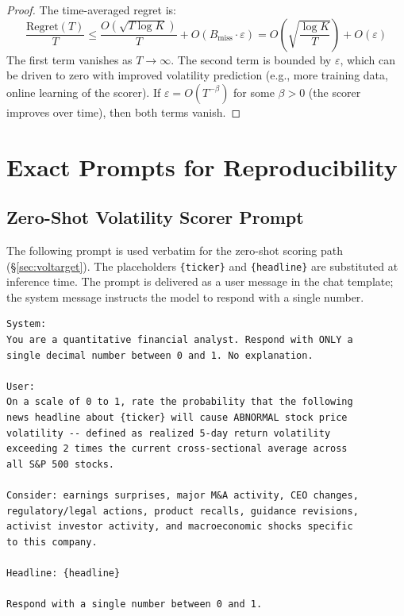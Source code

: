 \documentclass{article}
\begin{document}
\begin{proof}
The time-averaged regret is:
\begin{equation}
  \frac{\text{Regret}(T)}{T} \leq \frac{O(\sqrt{T \log K})}{T} + O(B_{\text{miss}} \cdot \varepsilon) = O\!\left(\sqrt{\frac{\log K}{T}}\right) + O(\varepsilon)
\end{equation}
The first term vanishes as $T \to \infty$.
The second term is bounded by $\varepsilon$, which can be driven to zero with improved volatility prediction (e.g., more training data, online learning of the scorer).
If $\varepsilon = O(T^{-\beta})$ for some $\beta > 0$ (the scorer improves over time), then both terms vanish.
\end{proof}

\section{Exact Prompts for Reproducibility}
\label{app:prompts}

\subsection{Zero-Shot Volatility Scorer Prompt}

The following prompt is used verbatim for the zero-shot scoring path (\S\ref{sec:voltarget}).
The placeholders \texttt{\{ticker\}} and \texttt{\{headline\}} are substituted at inference time.
The prompt is delivered as a user message in the chat template; the system message instructs the model to respond with a single number.

\begin{lstlisting}[caption={Zero-shot volatility scoring prompt (exact text).}]
System:
You are a quantitative financial analyst. Respond with ONLY a
single decimal number between 0 and 1. No explanation.

User:
On a scale of 0 to 1, rate the probability that the following
news headline about {ticker} will cause ABNORMAL stock price
volatility -- defined as realized 5-day return volatility
exceeding 2 times the current cross-sectional average across
all S&P 500 stocks.

Consider: earnings surprises, major M&A activity, CEO changes,
regulatory/legal actions, product recalls, guidance revisions,
activist investor activity, and macroeconomic shocks specific
to this company.

Headline: {headline}

Respond with a single number between 0 and 1.
\end{lstlisting}
\end{document}
